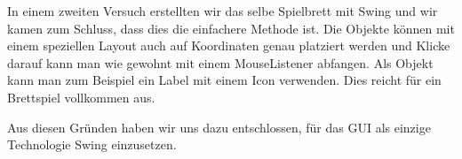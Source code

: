 \documentclass[a4paper,12pt,halfparskip,DIV14]{scrartcl}
\begin{document}
In einem zweiten Versuch erstellten wir das selbe Spielbrett mit Swing und wir kamen zum Schluss, dass dies die einfachere Methode ist. Die Objekte können mit einem speziellen Layout auch auf Koordinaten genau platziert werden und Klicke darauf kann man wie gewohnt mit einem MouseListener abfangen. Als Objekt kann man zum Beispiel ein Label mit einem Icon verwenden. Dies reicht für ein Brettspiel vollkommen aus.

Aus diesen Gründen haben wir uns dazu entschlossen, für das GUI als einzige Technologie Swing einzusetzen.


\end{document}
